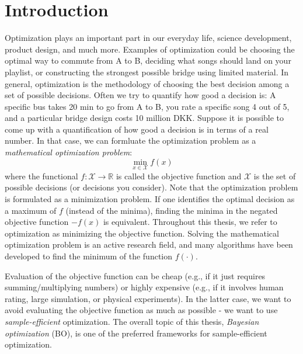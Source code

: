 \chapter{Introduction}



Optimization plays an important part in our everyday life, science development, product design, and
much more. Examples of optimization could be choosing the optimal way to commute from A to B,
deciding what songs should land on your playlist, or constructing the strongest possible bridge
using limited material. In general, optimization is the methodology of choosing the best decision
among a set of possible decisions. Often we try to quantify how good a decision is: A specific bus
takes 20 min to go from A to B, you rate a specific song 4 out of 5, and a particular bridge design
costs 10 million DKK. Suppose it is possible to come up with a quantification of how good a
decision is in terms of a real number. In that case, we can formluate the optimization problem as
a \textit{mathematical optimization problem}: 
$$\min_{x\in \mathcal{X}} f(x)$$ where the functional $f: \mathcal{X} \rightarrow \mathbb{R}$ is
called the objective function and $\mathcal{X}$ is the set of possible decisions (or decisions you
consider). Note that the optimization problem is formulated as a minimization problem. If one
identifies the optimal decision as a maximum of $f$ (instead of the minima), finding the minima in
the negated objective function $-f(x)$ is equivalent. Throughout this thesis, we refer to
optimization as minimizing the objective function. Solving the mathematical optimization problem is
an active research field, and many algorithms have been developed to find the minimum of the function
$f(\cdot)$.

Evaluation of the objective function can be cheap (e.g., if it just requires summing/multiplying
numbers) or highly expensive (e.g., if it involves human rating, large simulation, or physical
experiments). In the latter case, we want to avoid evaluating the objective function as much as
possible - we want to use \textit{sample-efficient} optimization. The overall topic of this
thesis, \textit{Bayesian optimization} (BO), is one of the preferred frameworks for sample-efficient optimization. 

